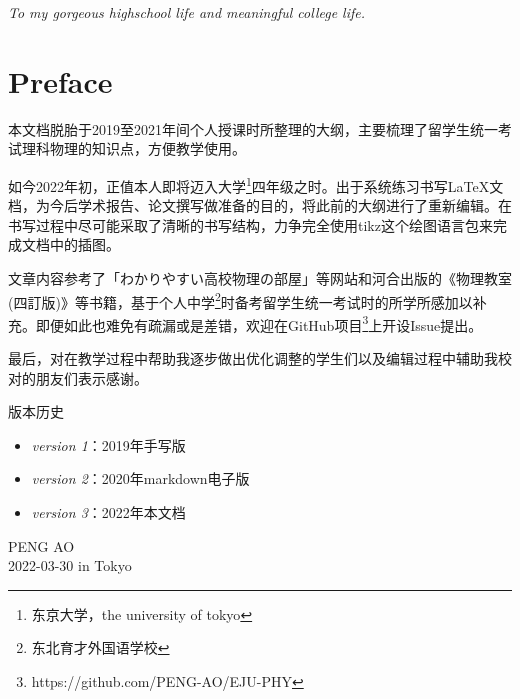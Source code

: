 
\clearpage
\begin{center}
    \null

    \vspace{0.382\textheight}
    \textit{\large
        To my gorgeous highschool life
        and meaningful college life.
    }
\end{center}


\clearpage
\chapter*{Preface}

本文档脱胎于2019至2021年间个人授课时所整理的大纲，主要梳理了留学生统一考试理科物理的知识点，方便教学使用。

如今2022年初，正值本人即将迈入大学\footnote{东京大学，the university of tokyo}四年级之时。出于系统练习书写\LaTeX 文档，为今后学术报告、论文撰写做准备的目的，将此前的大纲进行了重新编辑。在书写过程中尽可能采取了清晰的书写结构，力争完全使用tikz这个绘图语言包来完成文档中的插图。

文章内容参考了「わかりやすい高校物理の部屋」等网站和河合出版的《物理教室(四訂版)》等书籍，基于个人中学\footnote{东北育才外国语学校}时备考留学生统一考试时的所学所感加以补充。即便如此也难免有疏漏或是差错，欢迎在GitHub项目\footnote{https://github.com/PENG-AO/EJU-PHY}上开设Issue提出。

最后，对在教学过程中帮助我逐步做出优化调整的学生们以及编辑过程中辅助我校对的朋友们表示感谢。

\vfill
版本历史
\begin{itemize}
    \item \textit{version 1}：2019年手写版
    \item \textit{version 2}：2020年markdown电子版
    \item \textit{version 3}：2022年本文档
\end{itemize}

\vfill
\begin{flushright}
    PENG AO\\
    2022-03-30 in Tokyo
\end{flushright}


\clearpage
{}
\tableofcontents
